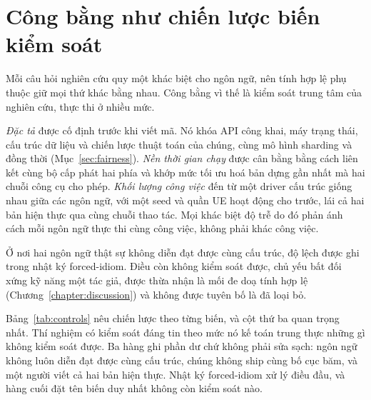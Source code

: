 \section{Công bằng như chiến lược biến kiểm soát}\label{sec:controls}
Mỗi câu hỏi nghiên cứu quy một khác biệt cho ngôn ngữ, nên tính hợp lệ phụ thuộc giữ mọi thứ khác
bằng nhau. Công bằng vì thế là kiểm soát trung tâm của nghiên cứu, thực thi ở nhiều mức.

\emph{Đặc tả} được cố định trước khi viết mã. Nó khóa API công khai, máy trạng thái, cấu trúc
dữ liệu và chiến lược thuật toán của chúng, cùng mô hình sharding và đồng thời (Mục~\ref{sec:fairness}).
\emph{Nền thời gian chạy} được cân bằng bằng cách liên kết cùng bộ cấp phát hai phía và khớp mức
tối ưu hoá bản dựng gần nhất mà hai chuỗi công cụ cho phép. \emph{Khối lượng công việc} đến từ
một driver cấu trúc giống nhau giữa các ngôn ngữ, với một seed và quần UE hoạt động cho trước,
lái cả hai bản hiện thực qua cùng chuỗi thao tác. Mọi khác biệt độ trễ do đó phản ánh cách mỗi
ngôn ngữ thực thi cùng công việc, không phải khác công việc.

Ở nơi hai ngôn ngữ thật sự không diễn đạt được cùng cấu trúc, độ lệch được ghi trong nhật ký
forced-idiom. Điều còn không kiểm soát được, chủ yếu bất đối xứng kỹ năng một tác giả, được
thừa nhận là mối đe doạ tính hợp lệ (Chương~\ref{chapter:discussion}) và không được tuyên bố là
đã loại bỏ.

Bảng~\ref{tab:controls} nêu chiến lược theo từng biến, và cột thứ ba quan trọng nhất. Thí
nghiệm có kiểm soát đáng tin theo mức nó kế toán trung thực những gì không kiểm soát được. Ba
hàng ghi phần dư chứ không phải sửa sạch: ngôn ngữ không luôn diễn đạt được cùng cấu trúc, chúng
không ship cùng bố cục băm, và một người viết cả hai bản hiện thực. Nhật ký forced-idiom xử lý
điều đầu, và hàng cuối đặt tên biến duy nhất không còn kiểm soát nào.

